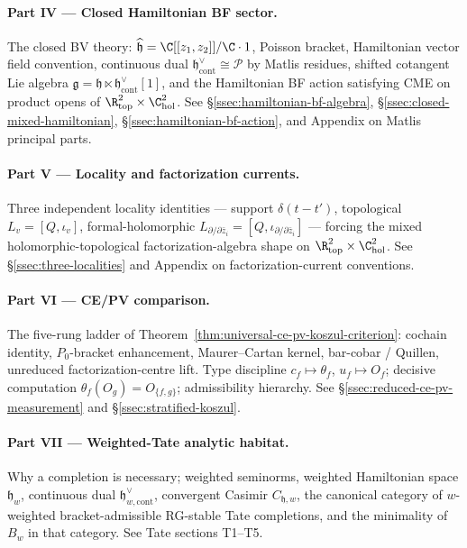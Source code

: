 \paragraph{Part IV --- Closed Hamiltonian BF sector.}  The closed BV
theory: \(\widehat{\mathfrak h}=\C[[z_1,z_2]]/\C\cdot1\), Poisson
bracket, Hamiltonian vector field convention, continuous dual
\(\mathfrak h^\vee_{\mathrm{cont}}\cong\mathcal P\) by Matlis residues,
shifted cotangent Lie algebra
\(\mathfrak g=\mathfrak h\ltimes\mathfrak h^\vee_{\mathrm{cont}}[1]\),
and the Hamiltonian BF action satisfying CME on product opens of
\(\R^2_{\mathrm{top}}\times\C^2_{\mathrm{hol}}\).  See
\S\ref{ssec:hamiltonian-bf-algebra},
\S\ref{ssec:closed-mixed-hamiltonian},
\S\ref{ssec:hamiltonian-bf-action}, and Appendix on Matlis principal
parts.

\paragraph{Part V --- Locality and factorization currents.}  Three
independent locality identities --- support \(\delta(t-t')\),
topological \(L_v=[Q,\iota_v]\), formal-holomorphic
\(L_{\partial/\partial\bar z_i}=[Q,\iota_{\partial/\partial\bar z_i}]\)
--- forcing the mixed holomorphic-topological factorization-algebra
shape on \(\R^2_{\mathrm{top}}\times\C^2_{\mathrm{hol}}\).  See
\S\ref{ssec:three-localities} and Appendix on factorization-current
conventions.

\paragraph{Part VI --- CE/PV comparison.}  The five-rung ladder of
Theorem~\ref{thm:universal-ce-pv-koszul-criterion}: cochain identity,
\(P_0\)-bracket enhancement, Maurer--Cartan kernel, bar-cobar /
Quillen, unreduced factorization-centre lift.  Type discipline
\(c_f\mapsto\theta_f\), \(u_f\mapsto O_f\); decisive computation
\(\theta_f(O_g)=O_{\{f,g\}}\); admissibility hierarchy.  See
\S\ref{ssec:reduced-ce-pv-measurement} and
\S\ref{ssec:stratified-koszul}.

\paragraph{Part VII --- Weighted-Tate analytic habitat.}  Why a
completion is necessary; weighted seminorms, weighted Hamiltonian
space \(\mathfrak h_w\), continuous dual
\(\mathfrak h^\vee_{w,\mathrm{cont}}\), convergent Casimir
\(C_{\mathfrak h,w}\), the canonical category of \(w\)-weighted
bracket-admissible RG-stable Tate completions, and the minimality of
\(B_w\) in that category.  See Tate sections T1--T5.

